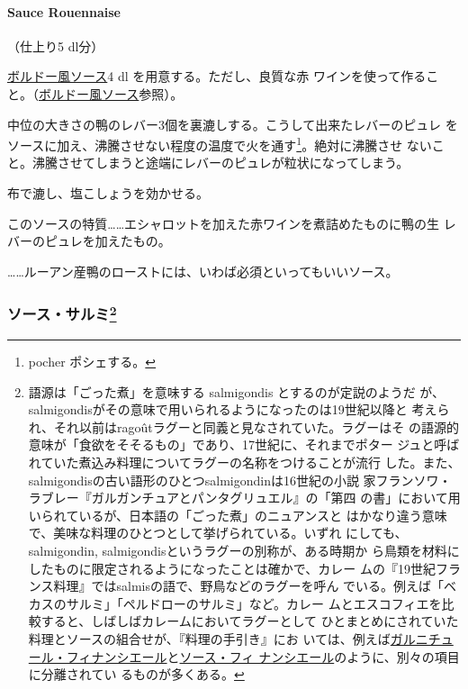 \hypertarget{sauce-rouennaise}{%
\paragraph{Sauce Rouennaise}\label{sauce-rouennaise}}

   

（仕上り5 dl分）

\protect\hyperlink{sauce-bordelaise}{ボルドー風ソース}4 dl
を用意する。ただし、良質な赤
ワインを使って作ること。（\protect\hyperlink{sauce-bordelaise}{ボルドー風ソース}参照）。

中位の大きさの鴨のレバー3個を裏漉しする。こうして出来たレバーのピュレ
をソースに加え、沸騰させない程度の温度で火を通す\footnote{pocher
  ポシェする。}。絶対に沸騰させ
ないこと。沸騰させてしまうと途端にレバーのピュレが粒状になってしまう。

布で漉し、塩こしょうを効かせる。

このソースの特質\ldots{}\ldots{}エシャロットを加えた赤ワインを煮詰めたものに鴨の生
レバーのピュレを加えたもの。

\ldots{}\ldots{}ルーアン産鴨のローストには、いわば必須といってもいいソース。

\maeaki

\hypertarget{ux30bdux30fcux30b9ux30b5ux30ebux30df92}{%
\subsubsection[ソース・サルミ]{\texorpdfstring{ソース・サルミ\footnote{語源は「ごった煮」を意味する
  salmigondis とするのが定説のようだ
  が、salmigondisがその意味で用いられるようになったのは19世紀以降と
  考えられ、それ以前はragoûtラグーと同義と見なされていた。ラグーはそ
  の語源的意味が「食欲をそそるもの」であり、17世紀に、それまでポター
  ジュと呼ばれていた煮込み料理についてラグーの名称をつけることが流行
  した。また、salmigondisの古い語形のひとつsalmigondinは16世紀の小説
  家フランソワ・ラブレー『ガルガンチュアとパンタグリュエル』の「第四
  の書」において用いられているが、日本語の「ごった煮」のニュアンスと
  はかなり違う意味で、美味な料理のひとつとして挙げられている。いずれ
  にしても、salmigondin, salmigondisというラグーの別称が、ある時期か
  ら鳥類を材料にしたものに限定されるようになったことは確かで、カレー
  ムの『19世紀フランス料理』ではsalmisの語で、野鳥などのラグーを呼ん
  でいる。例えば「ベカスのサルミ」「ペルドローのサルミ」など。カレー
  ムとエスコフィエを比較すると、しばしばカレームにおいてラグーとして
  ひとまとめにされていた料理とソースの組合せが、『料理の手引き』にお
  いては、例えば\href{}{ガルニチュール・フィナンシエール}と\protect\hyperlink{sauce-financiere}{ソース・フィ
  ナンシエール}のように、別々の項目に分離されてい るものが多くある。}}{ソース・サルミ}}\label{ux30bdux30fcux30b9ux30b5ux30ebux30df92}}

